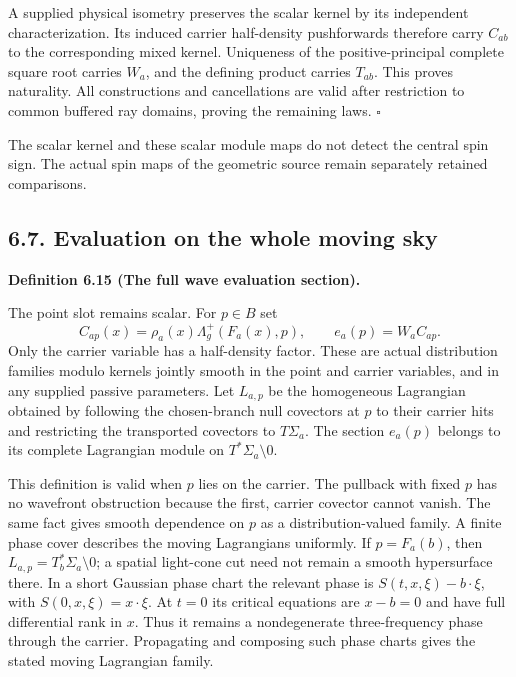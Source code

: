 \documentclass[
  english,
  11pt,
  reqno]{amsart}
\makeatletter
\newcommand{\paperdisplaynext}{%
  \let\paper@savedstartsection\@startsection
  \def\@startsection##1##2##3##4##5##6{%
    \let\@startsection\paper@savedstartsection
    \@tempskipa ##5\relax
    \ifdim\@tempskipa<\z@
      \def\paper@afterskip{.35\baselineskip}%
    \else
      \def\paper@afterskip{##5}%
    \fi
    \@startsection{##1}{##2}{##3}{##4}{\paper@afterskip}{##6}}}
\newcommand{\paperdisplaysection}{\paperdisplaynext\subsection}
\newcommand{\pandocstatementheading}[1]{%
  \par\if@nobreak\else
    \addpenalty{\@beginparpenalty}%
    \addvspace{.5\baselineskip plus .2\baselineskip minus .2\baselineskip}%
  \fi
  {\normalfont\bfseries #1\par}%
  \nobreak\@afterindenttrue\@afterheading
}
\let\paper@displaysection\paperdisplaysection
\renewcommand{\paperdisplaysection}[1]{%
  \let\paper@savedhangfrom\@hangfrom
  \long\def\@hangfrom##1##2{%
    \paper@savedhangfrom{##1}{\paper@headingparagraph##2}}%
  \paper@displaysection{#1}%
  \let\@hangfrom\paper@savedhangfrom}
\makeatother
\begin{document}
A supplied physical isometry preserves the scalar kernel by its
independent characterization. Its induced carrier half-density
pushforwards therefore carry \(C_{ab}\) to the corresponding mixed
kernel. Uniqueness of the positive-principal complete square root
carries \(W_a\), and the defining product carries \(T_{ab}\). This
proves naturality. All constructions and cancellations are valid after
restriction to common buffered ray domains, proving the remaining laws.
\hfill\(\square\)

The scalar kernel and these scalar module maps do not detect the central
spin sign. The actual spin maps of the geometric source remain
separately retained comparisons.

\paperdisplaysection{6.7. Evaluation on the whole moving
sky}\label{evaluation-on-the-whole-moving-sky}\label{sec:online-complete-wave-evaluation}

\pandocstatementheading{\leavevmode{}\label{def:online-wave-evaluation-section}Definition 6.15 (The full wave evaluation section).}

The point slot remains scalar. For \(p\in B\) set%
 \[
C_{ap}(x)=\rho_a(x)\Lambda_g^+(F_a(x),p),
\qquad e_a(p)=W_aC_{ap}.
\] Only the carrier variable has a half-density factor. These are actual
distribution families modulo kernels jointly smooth in the point and
carrier variables, and in any supplied passive parameters. Let
\(L_{a,p}\) be the homogeneous Lagrangian obtained by following the
chosen-branch null covectors at \(p\) to their carrier hits and
restricting the transported covectors to \(T\Sigma_a\). The section
\(e_a(p)\) belongs to its complete Lagrangian module on
\(T^*\Sigma_a\setminus0\).

This definition is valid when \(p\) lies on the carrier. The pullback
with fixed \(p\) has no wavefront obstruction because the first, carrier
covector cannot vanish. The same fact gives smooth dependence on \(p\)
as a distribution-valued family. A finite phase cover describes the
moving Lagrangians uniformly. If \(p=F_a(b)\), then
\(L_{a,p}=T_b^*\Sigma_a\setminus0\); a spatial light-cone cut need not
remain a smooth hypersurface there. In a short Gaussian phase chart the
relevant phase is \(S(t,x,\xi)-b\cdot\xi\), with
\(S(0,x,\xi)=x\cdot\xi\). At \(t=0\) its critical equations are
\(x-b=0\) and have full differential rank in \(x\). Thus it remains a
nondegenerate three-frequency phase through the carrier. Propagating and
composing such phase charts gives the stated moving Lagrangian family.
\end{document}
